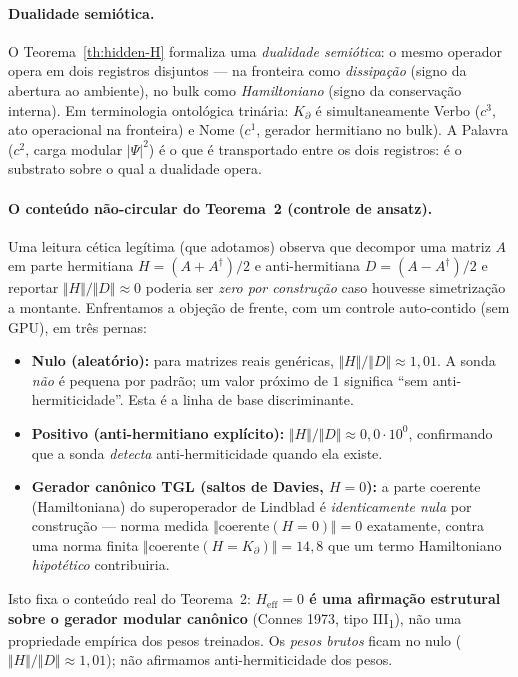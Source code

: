 \documentclass[12pt,a4paper]{article}
\newcommand{\Kpartial}{K_{\partial}}
\begin{document}
\paragraph{Dualidade semiótica.}
O Teorema~\ref{th:hidden-H} formaliza uma \emph{dualidade semiótica}: o
mesmo operador opera em dois registros disjuntos --- na fronteira como
\emph{dissipação} (signo da abertura ao ambiente), no bulk como
\emph{Hamiltoniano} (signo da conservação interna).  Em terminologia
ontológica trinária: $\Kpartial$ é simultaneamente Verbo ($c^{3}$, ato
operacional na fronteira) e Nome ($c^{1}$, gerador hermitiano no bulk).
A Palavra ($c^{2}$, carga modular $|\Psi|^{2}$) é o que é transportado
entre os dois registros: é o substrato sobre o qual a dualidade opera.

\paragraph{O conteúdo não-circular do Teorema~2 (controle de ansatz).}
Uma leitura cética legítima (que adotamos) observa que decompor uma matriz
$A$ em parte hermitiana $H=(A+A^{\dagger})/2$ e anti-hermitiana $D=(A-A^{\dagger})/2$
e reportar $\Vert H\Vert/\Vert D\Vert\approx 0$ poderia ser \emph{zero por
construção} caso houvesse simetrização a montante.  Enfrentamos a objeção
de frente, com um controle auto-contido (sem GPU), em três pernas:
\begin{itemize}
  \item \textbf{Nulo (aleatório):} para matrizes reais genéricas,
        $\Vert H\Vert/\Vert D\Vert \approx 1{,}01$.  A sonda
        \emph{não} é pequena por padrão; um valor próximo de $1$ significa
        ``sem anti-hermiticidade''.  Esta é a linha de base discriminante.
  \item \textbf{Positivo (anti-hermitiano explícito):}
        $\Vert H\Vert/\Vert D\Vert \approx 0{,}0 \cdot 10^{0}$, confirmando
        que a sonda \emph{detecta} anti-hermiticidade quando ela existe.
  \item \textbf{Gerador canônico TGL (saltos de Davies, $H=0$):} a parte
        coerente (Hamiltoniana) do superoperador de Lindblad é
        \emph{identicamente nula} por construção --- norma medida
        $\Vert\text{coerente}(H{=}0)\Vert = 0$
        exatamente, contra uma norma finita
        $\Vert\text{coerente}(H{=}\Kpartial)\Vert = 14{,}8$ que um
        termo Hamiltoniano \emph{hipotético} contribuiria.
\end{itemize}
Isto fixa o conteúdo real do Teorema~2: \textbf{$H_{\text{eff}}=0$ é uma
afirmação estrutural sobre o gerador modular canônico} (Connes 1973,
tipo III\textsubscript{1}), não uma propriedade empírica dos pesos treinados.
Os \emph{pesos brutos} ficam no nulo ($\Vert H\Vert/\Vert D\Vert\approx
1{,}01$); não afirmamos anti-hermiticidade dos pesos.
\end{document}
